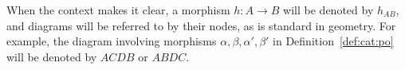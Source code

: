 \begin{notation}
    When the context makes it clear, a morphism \( h : A \to B \) will be denoted by \( h_{AB} \), and diagrams will be referred to by their nodes, as is standard in geometry. For example, the diagram involving morphisms \( \alpha, \beta, \alpha', \beta' \) in Definition~\ref{def:cat:po} will be denoted by \( ACDB \) or \( ABDC \).
\end{notation}   